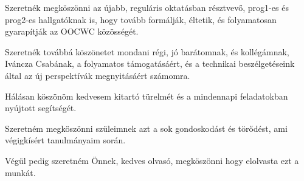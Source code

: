 \documentclass[a4paper,12pt]{report}
\begin{document}
Szeretnék megköszönni az újabb, reguláris oktatásban résztvevő, prog1-es és prog2-es hallgatóknak is, hogy tovább formálják, éltetik, és folyamatosan gyarapítják az OOCWC közösségét.

Szeretnék továbbá köszönetet mondani régi, jó barátomnak, és kollégámnak, Iváncza Csabának, a folyamatos támogatásáért, és a technikai beszélgetéseink által az új perspektívák megnyitásáért számomra.

Hálásan köszönöm kedvesem kitartó türelmét és a mindennapi feladatokban nyújtott segítségét.

Szeretném megköszönni szüleimnek azt a sok gondoskodást és törődést, ami végigkísért tanulmányaim során.

Végül pedig szeretném Önnek, kedves olvasó, megköszönni hogy elolvasta ezt a munkát.
\end{document}
